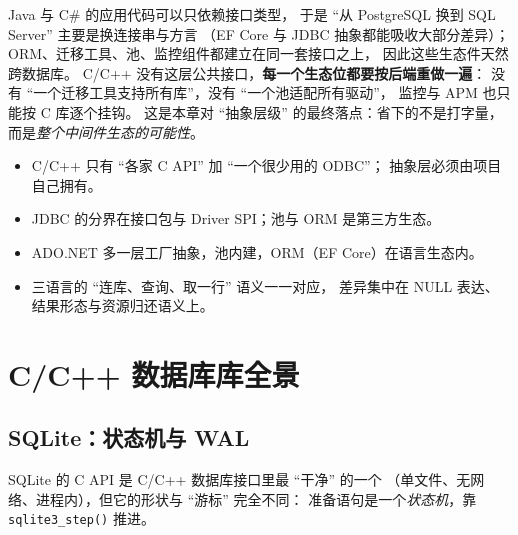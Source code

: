 \documentclass[12pt,a4paper,fontset=fandol]{ctexbook}
\newcommand{\Fn}[1]{\texttt{#1()}}
\newcommand{\CSharp}{C\#}
\newcommand{\CppJava}{C/C++}
\begin{document}
\begin{compare}[title=``接口在标准库、驱动是插件'' 为什么重要]
Java 与 \CSharp{} 的应用代码可以只依赖接口类型，
于是 ``从 PostgreSQL 换到 SQL Server'' 主要是换连接串与方言
（EF Core 与 JDBC 抽象都能吸收大部分差异）；
ORM、迁移工具、池、监控组件都建立在同一套接口之上，
因此这些生态件天然跨数据库。
\CppJava{} 没有这层公共接口，\textbf{每一个生态位都要按后端重做一遍}：
没有 ``一个迁移工具支持所有库''，没有 ``一个池适配所有驱动''，
监控与 APM 也只能按 C 库逐个挂钩。
这是本章对 ``抽象层级'' 的最终落点：省下的不是打字量，
而是\emph{整个中间件生态的可能性}。
\end{compare}

\begin{guideline}[title=本章要点]
\begin{itemize}
  \item \CppJava{} 只有 ``各家 C API'' 加 ``一个很少用的 ODBC''；
        抽象层必须由项目自己拥有。
  \item JDBC 的分界在接口包与 Driver SPI；池与 ORM 是第三方生态。
  \item ADO.NET 多一层工厂抽象，池内建，ORM（EF Core）在语言生态内。
  \item 三语言的 ``连库、查询、取一行'' 语义一一对应，
        差异集中在 NULL 表达、结果形态与资源归还语义上。
\end{itemize}
\end{guideline}


\chapter{\CppJava{} 数据库库全景}

\section{SQLite：状态机与 WAL}

SQLite 的 C API 是 \CppJava{} 数据库接口里最 ``干净'' 的一个
（单文件、无网络、进程内），但它的形状与 ``游标'' 完全不同：
准备语句是一个\emph{状态机}，靠 \Fn{sqlite3\_step} 推进。
\end{document}
